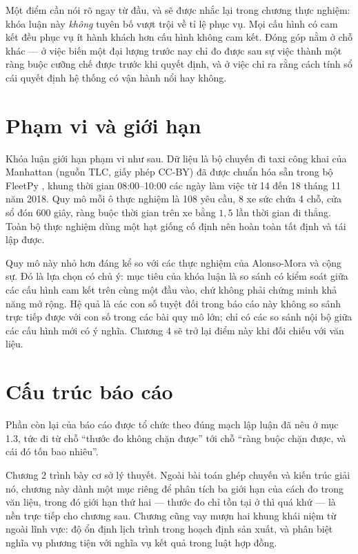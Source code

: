 Một điểm cần nói rõ ngay từ đầu, và sẽ được nhắc lại trong chương thực nghiệm: khóa luận này
\emph{không} tuyên bố vượt trội về tỉ lệ phục vụ. Mọi cấu hình có cam kết đều phục vụ ít hành
khách hơn cấu hình không cam kết. Đóng góp nằm ở chỗ khác --- ở việc biến một đại lượng trước
nay chỉ đo được sau sự việc thành một ràng buộc cưỡng chế được trước khi quyết định, và ở việc
chỉ ra rằng cách tính sổ cái quyết định hệ thống có vận hành nổi hay không.

\section{Phạm vi và giới hạn}

Khóa luận giới hạn phạm vi như sau. Dữ liệu là bộ chuyến đi taxi công khai của Manhattan
(nguồn TLC, giấy phép CC-BY) đã được chuẩn hóa sẵn trong bộ FleetPy \cite{fleetpy2022}, khung
thời gian 08:00--10:00 các ngày làm việc từ 14 đến 18 tháng 11 năm 2018. Quy mô mỗi ô thực
nghiệm là 108 yêu cầu, 8 xe sức chứa 4 chỗ, cửa sổ đón 600 giây, ràng buộc thời gian trên xe
bằng $1{,}5$ lần thời gian đi thẳng. Toàn bộ thực nghiệm dùng một hạt giống cố định nên hoàn
toàn tất định và tái lập được.

Quy mô này nhỏ hơn đáng kể so với các thực nghiệm của Alonso-Mora và cộng sự. Đó là lựa chọn
có chủ ý: mục tiêu của khóa luận là so sánh có kiểm soát giữa các cấu hình cam kết trên cùng
một đầu vào, chứ không phải chứng minh khả năng mở rộng. Hệ quả là các con số tuyệt đối trong
báo cáo này không so sánh trực tiếp được với con số trong các bài quy mô lớn; chỉ có các so
sánh nội bộ giữa các cấu hình mới có ý nghĩa. Chương 4 sẽ trở lại điểm này khi đối chiếu với
văn liệu.

\section{Cấu trúc báo cáo}

Phần còn lại của báo cáo được tổ chức theo đúng mạch lập luận đã nêu ở mục 1.3, tức đi từ chỗ
``thước đo không chặn được'' tới chỗ ``ràng buộc chặn được, và cái đó tốn bao nhiêu''.

Chương 2 trình bày cơ sở lý thuyết. Ngoài bài toán ghép chuyến và kiến trúc giải nó, chương này
dành một mục riêng để phân tích ba giới hạn của cách đo trong văn liệu, trong đó giới hạn thứ
hai --- thước đo chỉ tồn tại ở thì quá khứ --- là nền trực tiếp cho chương sau. Chương cũng vay
mượn hai khung khái niệm từ ngoài lĩnh vực: độ ổn định lịch trình trong hoạch định sản xuất, và
phân biệt nghĩa vụ phương tiện với nghĩa vụ kết quả trong luật hợp đồng.

